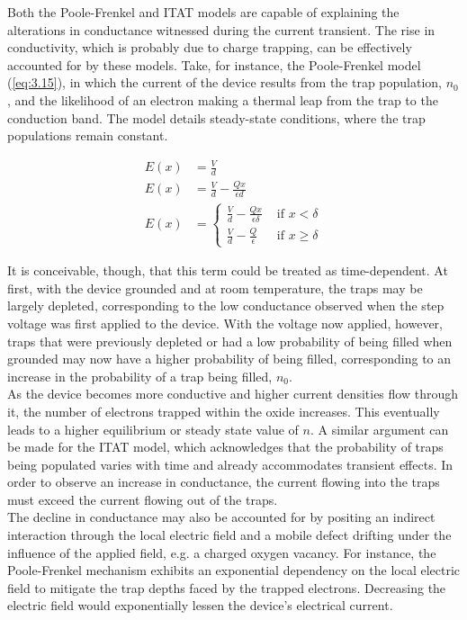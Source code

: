 \noindent Both the Poole-Frenkel and ITAT models are capable of explaining the alterations in conductance witnessed during the current transient. The rise in conductivity, which is probably due to charge trapping, can be effectively accounted for by these models. Take, for instance, the Poole-Frenkel model (\ref{eq:3.15}), in which the current of the device results from the trap population, $n_0$, and the likelihood of an electron making a thermal leap from the trap to the conduction band. The model details steady-state conditions, where the trap populations remain constant.

\begin{align}
    E(x) &= \frac{V}{d} \label{eq:3.16} \\
    E(x) &= \frac{V}{d} - \frac{Qx}{\epsilon d} \label{eq:3.17}\\
    E(x) &= \begin{cases}
\frac{V}{d} - \frac{Qx}{\epsilon \delta} & \text{ if } x< \delta \\ 
\frac{V}{d} - \frac{Q}{\epsilon} & \text{ if } x\geq \delta 
\end{cases} \label{eq:3.18}
\end{align}

\noindent It is conceivable, though, that this term could be treated as time-dependent. At first, with the device grounded and at room temperature, the traps may be largely depleted, corresponding to the low conductance observed when the step voltage was first applied to the device. With the voltage now applied, however, traps that were previously depleted or had a low probability of being filled when grounded may now have a higher probability of being filled, corresponding to an increase in the probability of a trap being filled, $n_0$.\\

\noindent As the device becomes more conductive and higher current densities flow through it, the number of electrons trapped within the oxide increases. This eventually leads to a higher equilibrium or steady state value of $n$. A similar argument can be made for the ITAT model, which acknowledges that the probability of traps being populated varies with time and already accommodates transient effects. In order to observe an increase in conductance, the current flowing into the traps must exceed the current flowing out of the traps.\\

\noindent The decline in conductance may also be accounted for by positing an indirect interaction through the local electric field and a mobile defect drifting under the influence of the applied field, e.g. a charged oxygen vacancy. For instance, the Poole-Frenkel mechanism exhibits an exponential dependency on the local electric field to mitigate the trap depths faced by the trapped electrons. Decreasing the electric field would exponentially lessen the device's electrical current.\\

